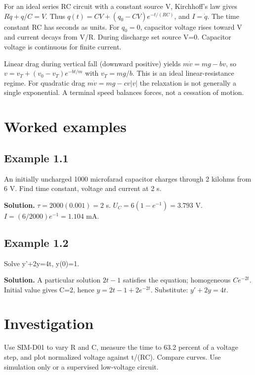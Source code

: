 \documentclass[11pt,a4paper,openany]{book}
\begin{document}
For an ideal series RC circuit with a constant source V, Kirchhoff's law gives $R\dot q+q/C=V$. Thus $q(t)=CV+(q_0-CV)e^{-t/(RC)}$, and $I=\dot q$. The time constant RC has seconds as units. For $q_0=0$, capacitor voltage rises toward V and current decays from V/R. During discharge set source V=0. Capacitor voltage is continuous for finite current.

Linear drag during vertical fall (downward positive) yields $m\dot v=mg-bv$, so $v=v_T+(v_0-v_T)e^{-bt/m}$ with $v_T=mg/b$. This is an ideal linear-resistance regime. For quadratic drag $m\dot v=mg-cv|v|$ the relaxation is not generally a single exponential. A terminal speed balances forces, not a cessation of motion.
\begin{center}
\end{center}
\section{Worked examples}
\subsection*{Example 1.1}
An initially uncharged 1000 microfarad capacitor charges through 2 kilohms from 6 V. Find time constant, voltage and current at 2 s.

\textbf{Solution.} $\tau=2000(0.001)=2$ s. $U_C=6(1-e^{-1})=3.793$ V. $I=(6/2000)e^{-1}=1.104$ mA.
\subsection*{Example 1.2}
Solve y'+2y=4t, y(0)=1.

\textbf{Solution.} A particular solution $2t-1$ satisfies the equation; homogeneous $Ce^{-2t}$. Initial value gives C=2, hence $y=2t-1+2e^{-2t}$. Substitute: $y'+2y=4t$.
\section{Investigation}
Use SIM-D01 to vary R and C, measure the time to 63.2 percent of a voltage step, and plot normalized voltage against t/(RC). Compare curves. Use simulation only or a supervised low-voltage circuit.
\end{document}
